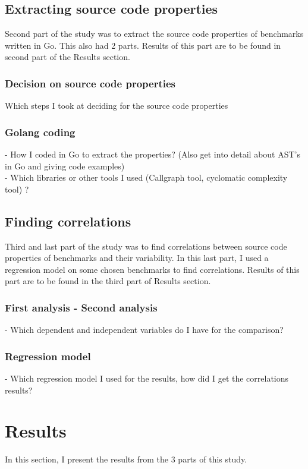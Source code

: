 \documentclass{seal_thesis}
\begin{document}
\section{Extracting source code properties}
Second part of the study was to extract the source code properties of benchmarks written in Go. This also had 2 parts. Results of this part are to be found in second part of the Results section.

\subsection{Decision on source code properties}
Which steps I took at deciding for the source code properties

\subsection{Golang coding}
- How I coded in Go to extract the properties? (Also get into detail about AST's in Go and giving code examples) \\
- Which libraries or other tools I used (Callgraph tool, cyclomatic complexity tool) ? \\

\section{Finding correlations}
Third and last part of the study was to find correlations between source code properties of benchmarks and their variability. In this last part, I used a regression model on some chosen benchmarks to find correlations. Results of this part are to be found in the third part of Results section.
\subsection{First analysis - Second analysis}
- Which dependent and independent variables do I have for the comparison?
\subsection{Regression model}
- Which regression model I used for the results, how did I get the correlations results?

\chapter{Results}
In this section, I present the results from the 3 parts of this study. 
\end{document}
